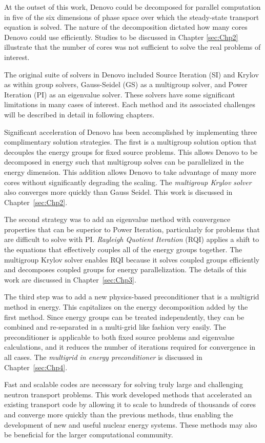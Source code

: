 At the outset of this work, Denovo could be decomposed for parallel computation in five of the six dimensions of phase space over which the steady-state transport equation is solved. The nature of the decomposition dictated how many cores Denovo could use efficiently. Studies to be discussed in Chapter \ref{sec:Chp2} illustrate that the number of cores was not sufficient to solve the real problems of interest. 

The original suite of solvers in Denovo included Source Iteration (SI) and Krylov as within group solvers, Gauss-Seidel (GS) as a multigroup solver, and Power Iteration (PI) as an eigenvalue solver. These solvers have some significant limitations in many cases of interest. Each method and its associated challenges will be described in detail in following chapters. 

Significant acceleration of Denovo has been accomplished by implementing three complimentary solution strategies. The first is a multigroup solution option that decouples the energy groups for fixed source problems. This allows Denovo to be decomposed in energy such that multigroup solves can be parallelized in the energy dimension. This addition allows Denovo to take advantage of many more cores without significantly degrading the scaling. The \emph{multigroup Krylov solver} also converges more quickly than Gauss Seidel. This work is discussed in Chapter~\ref{sec:Chp2}.

The second strategy was to add an eigenvalue method with convergence properties that can be superior to Power Iteration, particularly for problems that are difficult to solve with PI. \emph{Rayleigh Quotient Iteration} (RQI) applies a shift to the equations that effectively couples all of the energy groups together. The multigroup Krylov solver enables RQI because it solves coupled groups efficiently and decomposes coupled groups for energy parallelization. The details of this work are discussed in Chapter~\ref{sec:Chp3}.

The third step was to add a new physics-based preconditioner that is a multigrid method in energy. This capitalizes on the energy decomposition added by the first method. Since energy groups can be treated independently, they can be combined and re-separated in a multi-grid like fashion very easily. The preconditioner is applicable to both fixed source problems and eigenvalue calculations, and it reduces the number of iterations required for convergence in all cases. The \emph{multigrid in energy preconditioner} is discussed in Chapter~\ref{sec:Chp4}.

Fast and scalable codes are necessary for solving truly large and challenging neutron transport problems. This work developed methods that accelerated an existing transport code by allowing it to scale to hundreds of thousands of cores and converge more quickly than the previous methods, thus enabling the development of new and useful nuclear energy systems. These methods may also be beneficial for the larger computational community.  
